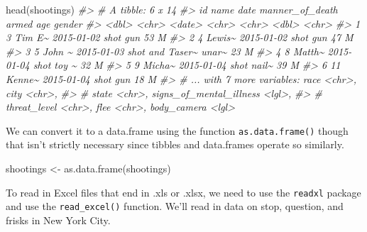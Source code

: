 \documentclass[
]{krantz}
\makeatletter
\newenvironment{Shaded}{\begin{snugshade}}{\end{snugshade}}
\newcommand{\CommentTok}[1]{\textcolor[rgb]{0.37,0.37,0.37}{\textit{#1}}}
\newcommand{\FunctionTok}[1]{\textcolor[rgb]{0,0,0}{#1}}
\newcommand{\NormalTok}[1]{#1}
\newcommand{\OtherTok}[1]{\textcolor[rgb]{0.37,0.37,0.37}{#1}}
\newenvironment{kframe}{%
\medskip{}
\setlength{\fboxsep}{.8em}
 \def\at@end@of@kframe{}%
 \ifinner\ifhmode%
  \def\at@end@of@kframe{\end{minipage}}%
  \begin{minipage}{\columnwidth}%
 \fi\fi%
 \def\FrameCommand##1{\hskip\@totalleftmargin \hskip-\fboxsep
 \colorbox{shadecolor}{##1}\hskip-\fboxsep
     \hskip-\linewidth \hskip-\@totalleftmargin \hskip\columnwidth}%
 \MakeFramed {\advance\hsize-\width
   \@totalleftmargin\z@ \linewidth\hsize
   \@setminipage}}%
 {\par\unskip\endMakeFramed%
 \at@end@of@kframe}
\renewenvironment{Shaded}{\begin{kframe}}{\end{kframe}}
\makeatother
\begin{document}
\begin{Shaded}
\begin{Highlighting}[]
\FunctionTok{head}\NormalTok{(shootings)}
\CommentTok{\#\textgreater{} \# A tibble: 6 x 14}
\CommentTok{\#\textgreater{}      id name   date       manner\_of\_death armed   age gender}
\CommentTok{\#\textgreater{}   \textless{}dbl\textgreater{} \textless{}chr\textgreater{}  \textless{}date\textgreater{}     \textless{}chr\textgreater{}           \textless{}chr\textgreater{} \textless{}dbl\textgreater{} \textless{}chr\textgreater{} }
\CommentTok{\#\textgreater{} 1     3 Tim E\textasciitilde{} 2015{-}01{-}02 shot            gun      53 M     }
\CommentTok{\#\textgreater{} 2     4 Lewis\textasciitilde{} 2015{-}01{-}02 shot            gun      47 M     }
\CommentTok{\#\textgreater{} 3     5 John \textasciitilde{} 2015{-}01{-}03 shot and Taser\textasciitilde{} unar\textasciitilde{}    23 M     }
\CommentTok{\#\textgreater{} 4     8 Matth\textasciitilde{} 2015{-}01{-}04 shot            toy \textasciitilde{}    32 M     }
\CommentTok{\#\textgreater{} 5     9 Micha\textasciitilde{} 2015{-}01{-}04 shot            nail\textasciitilde{}    39 M     }
\CommentTok{\#\textgreater{} 6    11 Kenne\textasciitilde{} 2015{-}01{-}04 shot            gun      18 M     }
\CommentTok{\#\textgreater{} \# ... with 7 more variables: race \textless{}chr\textgreater{}, city \textless{}chr\textgreater{},}
\CommentTok{\#\textgreater{} \#   state \textless{}chr\textgreater{}, signs\_of\_mental\_illness \textless{}lgl\textgreater{},}
\CommentTok{\#\textgreater{} \#   threat\_level \textless{}chr\textgreater{}, flee \textless{}chr\textgreater{}, body\_camera \textless{}lgl\textgreater{}}
\end{Highlighting}
\end{Shaded}

We can convert it to a data.frame using the function
\texttt{as.data.frame()} though that isn't strictly
necessary since tibbles and data.frames operate so
similarly.

\begin{Shaded}
\begin{Highlighting}[]
\NormalTok{shootings }\OtherTok{\textless{}{-}} \FunctionTok{as.data.frame}\NormalTok{(shootings)}
\end{Highlighting}
\end{Shaded}

To read in Excel files that end in .xls or .xlsx, we need to
use the \texttt{readxl} package and use the
\texttt{read\_excel()} function. We'll read in data on stop,
question, and frisks in New York City.
\end{document}
